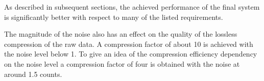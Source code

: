 As described %
in subsequent sections, the achieved performance of the final system is significantly better with respect to many of the listed requirements.  %

The magnitude of the noise also %
has an effect on the quality of the lossless compression of the raw data. %
A compression factor of about \num{10} is achieved with the \rms noise level below \SI{1}{}. To give an idea of the compression efficiency dependency on the noise level a compression factor of four is obtained with the noise at around \SI{1.5}{} counts. 




